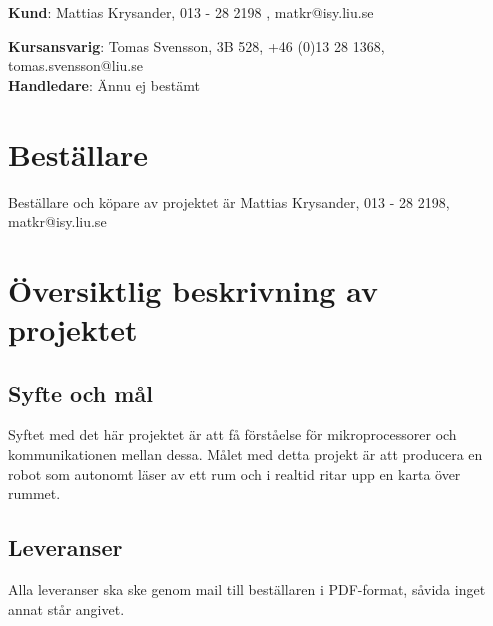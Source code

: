 \documentclass{article}
\begin{document}
\begin{center}
\textbf{Kund}: Mattias Krysander, 013 - 28 2198 , matkr@isy.liu.se
\end{center}

\begin{center}
\textbf{Kursansvarig}: Tomas Svensson, 3B 528, +46 (0)13 28 1368, tomas.svensson@liu.se \\
\textbf{Handledare}: Ännu ej bestämt
\end{center}
\vspace*{\fill}
\clearpage



\renewcommand*\contentsname{Innehållsförteckning}
\tableofcontents
\clearpage

\section{Beställare}
Beställare och köpare av projektet är Mattias Krysander, 013 - 28 2198, matkr@isy.liu.se

\section{Översiktlig beskrivning av projektet}

\subsection{Syfte och mål}
Syftet med det här projektet är att få förståelse för mikroprocessorer och kommunikationen mellan
dessa. Målet med detta projekt är att producera en robot som autonomt läser av ett rum och i realtid  ritar upp en karta över rummet.

\subsection{Leveranser}
Alla leveranser ska ske genom mail till beställaren i PDF-format, såvida inget annat står angivet. 
\end{document}
